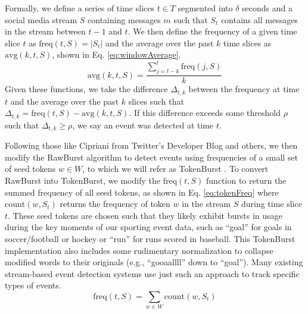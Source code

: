 \documentclass[letterpaper]{article}
\begin{document}
Formally, we define a series of time slices $t \in T$ segmented into $\delta$ seconds and a social media stream $S$ containing messages $m$ such that $S_t$ contains all messages in the stream between $t-1$ and $t$.
We then define the frequency of a given time slice $t$ as $\text{freq}(t, S) = |S_t|$ and the average over the past $k$ time slices as $\text{avg}(k, t, S)$, shown in Eq. \ref{eq:windowAverage}.
%
\begin{equation}
\label{eq:windowAverage}
\text{avg}(k, t, S) = \frac{\sum_{j=t-k}^{t}\text{freq}(j, S)}{k}
\end{equation}
%
Given these functions, we take the difference $\Delta_{t, k}$ between the frequency at time $t$ and the average over the past $k$ slices such that $\Delta_{t, k} = \text{freq}(t, S) - \text{avg}(k, t, S)$.
If this difference exceeds some threshold $\rho$ such that $\Delta_{t, k} \ge \rho$, we say an event was detected at time $t$.

Following those like Cipriani from Twitter's Developer Blog and others, we then modify the RawBurst algorithm to detect events using frequencies of a small set of seed tokens $w \in W$, to which we will refer as TokenBurst  \cite{Cipriani2014}. 
To convert RawBurst into TokenBurst, we modify the $\text{freq}(t, S)$ function to return the summed frequency of all seed tokens, as shown in Eq. \ref{eq:tokenFreq} where $\text{count}(w, S_t)$ returns the frequency of token $w$ in the stream $S$ during time slice $t$. 
These seed tokens are chosen such that they likely exhibit bursts in usage during the key moments of our sporting event data, such as ``goal'' for goals in soccer/football or hockey or ``run'' for runs scored in baseball.
This TokenBurst implementation also includes some rudimentary normalization to collapse modified words to their originals (e.g., ``gooaallll'' down to ``goal'').
Many existing stream-based event detection systems use just such an approach to track specific types of events.
%
\begin{equation}
\label{eq:tokenFreq}
\text{freq}(t, S) = \sum_{w \in W}\text{count}(w, S_t)
\end{equation}
\end{document}
